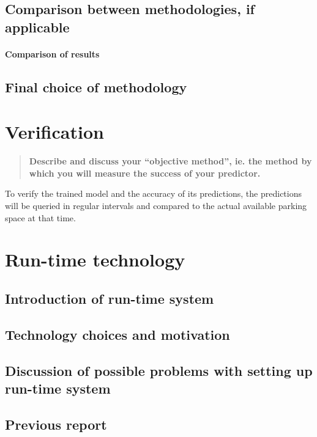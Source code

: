 \documentclass[journal,10pt]{IEEEtran}
\newcommand{\subtask}[1]{\begin{quote}\textbf{#1}\end{quote}}
\begin{document}
\subsection{Comparison between methodologies, if applicable}
\paragraph{Comparison of results}

\subsection{Final choice of methodology}



%
%



\section{Verification}
\subtask{Describe and discuss your ``objective method'', ie. the method by which you will measure the success of your predictor.}
To verify the trained model and the accuracy of its predictions, the predictions will be queried in regular intervals and compared to the actual available parking space at that time. 

%
%


\section{Run-time technology}

\subsection{Introduction of run-time system}

\subsection{Technology choices and motivation}

\subsection{Discussion of possible problems with setting up run-time system}

\subsection{Previous report}
\end{document}
